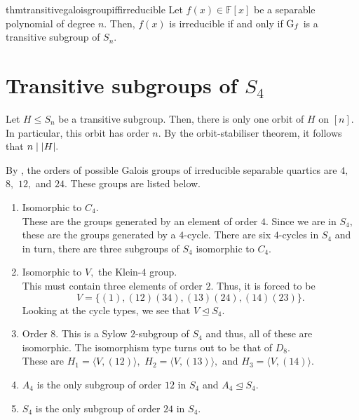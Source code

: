 \begin{restatable}[]{thm}{transitivegaloisgroupiffirreducible}
\label{thm:transitivegaloisgroupiffirreducible}
	Let $f(x) \in \mathbb{F}[x]$ be a separable polynomial of degree $n.$ Then, $f(x)$ is irreducible if and only if $\operatorname{G}_f$ is a transitive subgroup of $S_n.$ \hfill\hyperref[thm:transitivegaloisgroupiffirreducible2]{\downsym}
\end{restatable}

\section{Transitive subgroups of \texorpdfstring{$S_4$}{S4}}

Let $H \le S_n$ be a transitive subgroup. Then, there is only one orbit of $H$ on $[n].$ In particular, this orbit has order $n.$ By the orbit-stabiliser theorem, it follows that $n \mid {\left\lvert H \right\lvert}.$

By , the orders of possible Galois groups of irreducible separable quartics are $4,$ $8,$ $12,$ and $24.$ These groups are listed below.

\begin{enumerate}
	\item Isomorphic to $C_4.$ \\
	These are the groups generated by an element of order $4.$ Since we are in $S_4,$ these are the groups generated by a $4$-cycle. There are six $4$-cycles in $S_4$ and in turn, there are three subgroups of $S_4$ isomorphic to $C_4.$
	\item Isomorphic to $V,$ the Klein-$4$ group. \\
	This must contain three elements of order $2.$ Thus, it is forced to be 
	\begin{equation*} 
		V = \{(1), (12)(34), (13)(24), (14)(23)\}.
	\end{equation*}
	Looking at the cycle types, we see that $V \unlhd S_4.$
	\item Order $8.$ This is a Sylow $2$-subgroup of $S_4$ and thus, all of these are isomorphic. The isomorphism type turns out to be that of $D_8.$ \\
	These are $H_1 = \langle V, (12)\rangle,$ $H_2 = \langle V, (13)\rangle,$ and $H_3 = \langle V, (14)\rangle.$
	\item $A_4$ is the only subgroup of order $12$ in $S_4$ and $A_4 \unlhd S_4.$
	\item $S_4$ is the only subgroup of order $24$ in $S_4.$
\end{enumerate}

